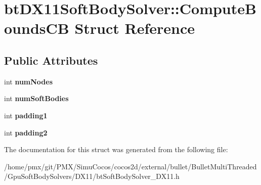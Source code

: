 \hypertarget{structbtDX11SoftBodySolver_1_1ComputeBoundsCB}{}\section{bt\+D\+X11\+Soft\+Body\+Solver\+:\+:Compute\+Bounds\+CB Struct Reference}
\label{structbtDX11SoftBodySolver_1_1ComputeBoundsCB}
\subsection*{Public Attributes}
\begin{DoxyCompactItemize}
\item 
\mbox{\label{structbtDX11SoftBodySolver_1_1ComputeBoundsCB_a4ae55180f8fecc1e4d02e7d5151a7e9a}} 
int {\bfseries num\+Nodes}
\item 
\mbox{\label{structbtDX11SoftBodySolver_1_1ComputeBoundsCB_aa17e0bd97d45f3893409d6777b62c192}} 
int {\bfseries num\+Soft\+Bodies}
\item 
\mbox{\label{structbtDX11SoftBodySolver_1_1ComputeBoundsCB_a7ebc9705e5a6e5ef2a513d2924b60474}} 
int {\bfseries padding1}
\item 
\mbox{\label{structbtDX11SoftBodySolver_1_1ComputeBoundsCB_a8d254459a631d5abd5e770a8a06c989f}} 
int {\bfseries padding2}
\end{DoxyCompactItemize}


The documentation for this struct was generated from the following file\+:\begin{DoxyCompactItemize}
\item 
/home/pmx/git/\+P\+M\+X/\+Simu\+Cocos/cocos2d/external/bullet/\+Bullet\+Multi\+Threaded/\+Gpu\+Soft\+Body\+Solvers/\+D\+X11/bt\+Soft\+Body\+Solver\+\_\+\+D\+X11.\+h\end{DoxyCompactItemize}
